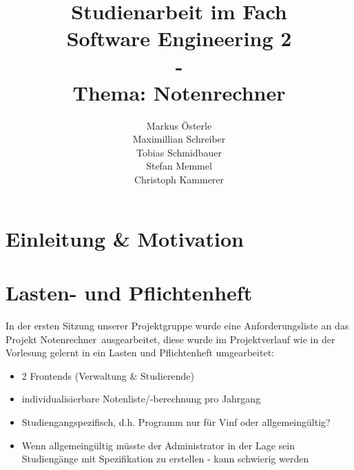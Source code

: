\documentclass[12pt,a4paper]{scrreprt}
\author{Markus Österle \\ Maximillian Schreiber \\ Tobias Schmidbauer \\ Stefan Memmel \\ Christoph Kammerer}
\title{Studienarbeit im Fach \\ \glqq Software Engineering 2\grqq \\ - \\ Thema: Notenrechner}
\date{}
\begin{document}
\maketitle
\tableofcontents
\chapter{Einleitung \& Motivation}
\chapter{Lasten- und Pflichtenheft}
In der ersten Sitzung unserer Projektgruppe wurde eine Anforderungsliste an das Projekt \glqq Notenrechner\grqq\ ausgearbeitet, diese wurde im Projektverlauf wie in der Vorlesung gelernt in ein Lasten\- und Pflichtenheft umgearbeitet:
\begin{itemize}
\item 2 Frontends (Verwaltung \& Studierende)
\item individualisierbare Notenliste/-berechnung pro Jahrgang
\item Studiengangspezifisch, d.h. Programm nur für Vinf oder allgemeingültig?
\item Wenn allgemeingültig müsste der Administrator in der Lage sein Studiengänge mit Spezifikation zu erstellen - kann schwierig werden


\end{itemize}
\end{document}
